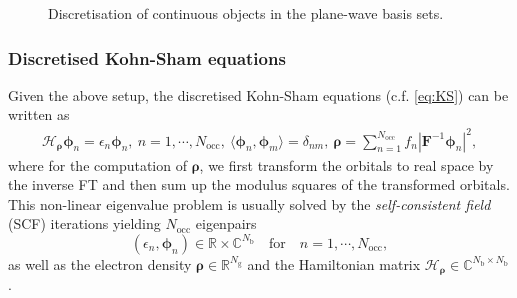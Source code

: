 \documentclass[hidelinks,onefignum,onetabnum]{siamart250211}
\newcommand{\R}{\mathbb{R}}
\newcommand{\C}{\mathbb{C}}
\newcommand{\Nocc}{N_{\mathrm{occ}}}
\newcommand{\KHxc}{K^{\mathrm{Hxc}}}
\newcommand{\X}{\mathbb{X}}
\newcommand{\Nb}{N_{\mathrm{b}}}
\newcommand{\Ng}{N_{\mathrm{g}}}
\newcommand{\Hrho}{\mathcal{H}_\rho}
\newcommand{\HrhoB}{\bm{\mathcal{H}}_{\bm \rho}}
\begin{document}
\begin{figure}
  \centering
  \caption{Discretisation of continuous objects in the plane-wave basis sets.}
  \label{fig:discretisation}
\end{figure}

\subsubsection{Discretised Kohn-Sham equations}
Given the above setup, the discretised Kohn-Sham equations (c.f. \eqref{eq:KS}) can be written as
\begin{equation}\label{eq:discretised_KS}
  \begin{gathered}
    \HrhoB \bm \phi_n = \epsilon_n \bm \phi_n, \ n=1,\cdots, \Nocc, \ \langle \bm \phi_n, \bm \phi_m \rangle = \delta_{nm}, \ \bm \rho = \sum_{n=1}^{\Nocc} f_n | \bm F^{-1} \bm \phi_n |^2,
  \end{gathered}
\end{equation}
where for the computation of $\bm \rho$, we first transform the orbitals to
real space by the inverse FT and then sum up the modulus squares of the
transformed orbitals. This non-linear eigenvalue problem is usually solved
by the \emph{self-consistent field} (SCF) iterations yielding $\Nocc$ eigenpairs
\begin{equation}
    \left(\epsilon_n,  \bm \phi_n \right) \in \R \times \C^{\Nb} \quad \text{for} \quad n=1,\cdots, \Nocc,
\end{equation}
as well as the electron density $\bm \rho \in \R^{\Ng}$ and the Hamiltonian matrix $\HrhoB \in \C^{\Nb \times \Nb}$.
\end{document}
